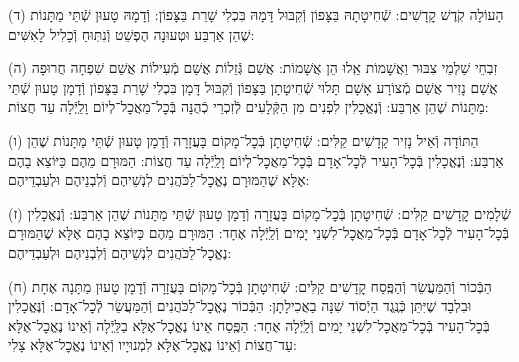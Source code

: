 \documentclass[twoside, openany, parskip=half, 11pt]{book}
\begin{document}
(ד) הָעוֹלָה קֹֽדֶשׁ קׇדָשִׁים: שְֿׁחִיטָתָהּ בַּצָּפוֹן וְֿקִבּוּל דָּמָהּ בִּכְלִי שָׁרֵת בַּצָּפוֹן: וְֿדָמָהּ טָעוּן שְֿׁתֵּי מַתָּנוֹת שֶׁהֵן אַרְבַּע וּטְעוּנָה הֶפְשֵׁט וְֿנִתּֽוּחַ וְֿכָלִיל לָאִשִּׁים:

(ה) זִבְחֵי שַׁלְמֵי צִבּוּר וַאֲשָׁמוֹת אֵֽלוּ הֵן אֲשָׁמוֹת: אֲשַׁם גְּֿזֵלוֹת אֲשַׁם מְֿעִילוֹת אֲשַׁם שִׁפְחָה חֲרוּפָה אֲשַׁם נָזִיר אֲשַׁם מְֿצוֹרָע אָשָׁם תָּלוּי שְֿׁחִיטָתָן בַּצָּפוֹן וְֿקִבּוּל דָּמָן בִּכְלִי שָׁרֵת בַּצָּפוֹן וְֿדָמָן טָעוּן שְֿׁתֵּי מַתָּנוֹת שֶׁהֵן אַרְבַּע: וְֿנֶאֱכָלִין לִפְנִים מִן הַקְּֿלָעִים לְֿזִכְרֵי כְֿהֻנָּה בְּֿכׇל־מַאֲכׇל־לְיוֹם וָלַֽיְֿלָה עַד חֲצוֹת:

(ו) הַתּוֹדָה וְֿאֵיל נָזִיר קָדָשִׁים קַלִּים: שְֿׁחִיטָתָן בְּֿכׇל־מָקוֹם בָּעֲזָרָה וְֿדָמָן טָעוּן שְֿׁתֵּי מַתָּנוֹת שֶׁהֵן אַרְבַּע: וְֿנֶאֱכָלִין בְּֿכׇל־הָעִיר לְֿכׇל־אָדָם בְּֿכׇל־מַאֲכׇל־לְיוֹם וָלַֽיְֿלָה עַד חֲצוֹת: הַמּוּרָם מֵהֶם כַּיּוֹצֵא בָהֶם אֶלָּא שֶׁהַמּוּרָם נֶאֱכׇל־לַכֹּהֲנִים לִנְשֵׁיהֶם וְֿלִבְנֵיהֶם וּלְעַבְדֵיהֶם:

(ז) שְֿׁלָמִים קׇדָשִׁים קַלִּים: שְֿׁחִיטָתָן בְּֿכׇל־מָקוֹם בָּעֲזָרָה וְֿדָמָן טָעוּן שְֿׁתֵּי מַתָּנוֹת שֶׁהֵן אַרְבַּע: וְֿנֶאֱכָלִין בְּֿכׇל־הָעִיר לְֿכׇל־אָדָם בְּֿכׇל־מַאֲכׇל־לִשְׁנֵי יָמִים וְֿלַֽיְֿלָה אֶחָד: הַמּוּרָם מֵהֶם כַּיּוֹצֵא בָהֶם אֶלָּא שֶׁהַמּוּרָם נֶאֱכׇל־לַכֹּהֲנִים לִנְשֵׁיהֶם וְֿלִבְנֵיהֶם וּלְעַבְדֵיהֶם:

(ח) הַבְּֿכוֹר וְֿהַמַּעֲשֵׂר וְֿהַפֶּֽסַח קׇדָשִׁים קַלִּים: שְֿׁחִיטָתָן בְּֿכׇל־מָקוֹם בָּעֲזָרָה וְֿדָמָן טָעוּן מַתָּנָה אֶחָת וּבִלְבָד שֶׁיִּתֵּן כְּֿנֶֽגֶד הַיְֿסוֹד שִׁנָּה בַאֲכִילָתָן: הַבְּֿכוֹר נֶאֱכׇל־לַכֹּהֲנִים וְֿהַמַּעֲשֵׂר לְֿכׇל־אָדָם: וְֿנֶּאֱכָלִין בְּֿכׇל־הָעִיר בְּֿכׇל־מַאֲכׇל־לִשְׁנֵי יָמִים וְֿלַֽיְֿלָה אֶחָד: הַפֶּֽסַח אֵינוֹ נֶאֱכׇל־אֶלָּא בַלַּֽיְֿלָה וְֿאֵינוֹ נֶאֱכׇל־אֶלָּא עַד־חֲצוֹת וְֿאֵינוֹ נֶאֱכׇל־אֶלָּא לִמְנוּיָיו וְֿאֵינוֹ נֶאֱכׇל־אֶלָּא צָלִי:

\nextpage

\end{document}
